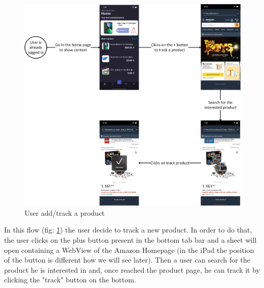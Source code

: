 \begin{figure}[h!]
        \centering
        \includegraphics[scale=0.14]{images/interfaces/user_add_track_product.png}
        \caption{User add/track a product}
        \label{fig:user_add_track_product}
\end{figure}
\FloatBarrier
In this flow (fig: \ref{fig:user_add_track_product}) the user decide to track a new product. In order to do that, the user clicks on the plus button present in the bottom tab bar and a sheet will open containing a WebView of the Amazon Homepage (in the iPad the position of the button is different how we will see later). Then a user can search for the product he is interested in and, once reached the product page, he can track it by clicking the "track" button on the bottom.

